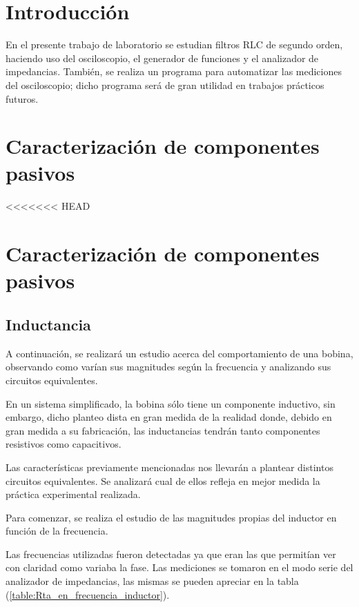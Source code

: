 \documentclass[11pt, a4paper]{article}
\begin{document}




\section{Introducción}
En el presente trabajo de laboratorio se estudian filtros RLC de segundo orden, haciendo uso del osciloscopio, el generador de funciones y el analizador de impedancias. También, se realiza un programa para automatizar las mediciones del osciloscopio; dicho programa será de gran utilidad en trabajos prácticos futuros.

\section{Caracterización de componentes pasivos}

<<<<<<< HEAD
\section*{Caracterización de componentes pasivos}

\subsection*{Inductancia}
A continuación, se realizará un estudio acerca del comportamiento de una bobina, observando como varían sus magnitudes según la frecuencia y analizando sus circuitos equivalentes.\par En un sistema simplificado, la bobina sólo tiene un componente inductivo, sin embargo, dicho planteo dista en gran medida de la realidad donde, debido en gran medida a su fabricación, las inductancias tendrán tanto componentes resistivos como capacitivos. \par Las características previamente mencionadas nos llevarán a plantear distintos circuitos equivalentes. Se analizará cual de ellos refleja en mejor medida la práctica experimental realizada.

Para comenzar, se realiza el estudio de las magnitudes propias del inductor en función de la frecuencia. \par Las frecuencias utilizadas fueron detectadas ya que eran las que permitían ver con claridad como variaba la fase. Las mediciones se tomaron en el modo serie del analizador de impedancias, las mismas se pueden apreciar en la tabla (\ref{table:Rta_en_frecuencia_inductor}).
\end{document}
